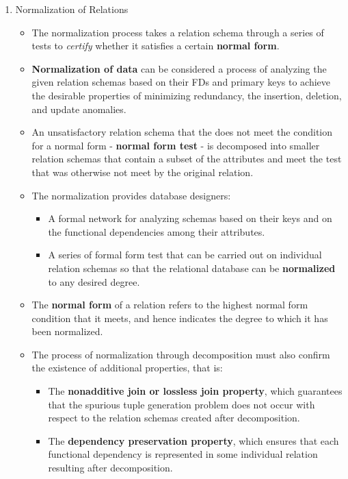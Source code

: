 \documentclass[10pt]{article}
\newcommand{\tf}{\textbf}
\newcommand{\ti}{\textit}
\begin{document}
\begin{enumerate}
	\item Normalization of Relations
	
	\begin{itemize}
		\item The normalization process takes a relation schema through a series of tests to \ti{certify} whether it satisfies a certain \tf{normal form}.
		\item \tf{Normalization of data} can be considered a process of analyzing the given relation schemas based on their FDs and primary keys to achieve the desirable properties of minimizing redundancy, the insertion, deletion, and update anomalies.
		\item An unsatisfactory relation schema that the does not meet the condition for a normal form - \tf{normal form test} - is decomposed into smaller relation schemas that contain a subset of the attributes and meet the test that was otherwise not meet by the original relation.
		\item The normalization provides database designers: \\
		
		\begin{itemize}
			\item A formal network for analyzing schemas based on their keys and on the functional dependencies among their attributes.
			\item A series of formal form test that can be carried out on individual relation schemas so that the relational database can be \tf{normalized} to any desired degree.
		\end{itemize}

		\item The \tf{normal form} of a relation refers to the highest normal form condition that it meets, and hence indicates the degree to which it has been normalized.
		
		\item The process of normalization through decomposition must also confirm the existence of additional properties, that is: 
		
		\begin{itemize}
			\item The \tf{nonadditive join or lossless join property}, which guarantees that the spurious tuple generation problem does not occur with respect to the relation schemas created after decomposition.
			\item The \tf{dependency preservation property}, which ensures that each functional dependency is represented in some individual relation resulting after decomposition.
		\end{itemize}


\end{itemize}
\end{enumerate}
\end{document}
